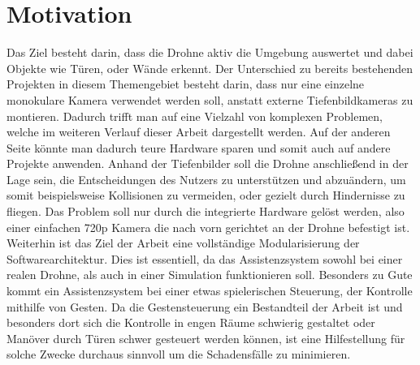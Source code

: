 \section{Motivation}
Das Ziel besteht darin, dass die Drohne aktiv die Umgebung auswertet und dabei Objekte wie Türen, oder Wände erkennt. Der Unterschied zu bereits bestehenden Projekten in diesem Themengebiet besteht darin, dass nur eine einzelne monokulare Kamera verwendet werden soll, anstatt externe Tiefenbildkameras zu montieren. \newline
Dadurch trifft man auf eine Vielzahl von komplexen Problemen, welche im weiteren Verlauf dieser Arbeit dargestellt werden. Auf der anderen Seite könnte man dadurch teure Hardware sparen und somit auch auf andere Projekte anwenden. \newline
Anhand der Tiefenbilder soll die Drohne anschließend in der Lage sein, die Entscheidungen des Nutzers zu unterstützen und abzuändern, um somit beispielsweise Kollisionen zu vermeiden, oder gezielt durch Hindernisse zu fliegen. \newline
Das Problem soll nur durch die integrierte Hardware gelöst werden, also einer einfachen 720p Kamera die nach vorn gerichtet an der Drohne befestigt ist. Weiterhin ist das Ziel der Arbeit eine vollständige Modularisierung der Softwarearchitektur. Dies ist essentiell, da das Assistenzsystem sowohl bei einer realen Drohne, als auch in einer Simulation funktionieren soll.\newline
Besonders zu Gute kommt ein Assistenzsystem bei einer etwas spielerischen Steuerung, der Kontrolle mithilfe von Gesten. Da die Gestensteuerung ein Bestandteil der Arbeit ist und besonders dort sich die Kontrolle in engen Räume schwierig gestaltet oder Manöver durch Türen schwer gesteuert werden können, ist eine Hilfestellung für solche Zwecke durchaus sinnvoll um die Schadensfälle zu minimieren. 
